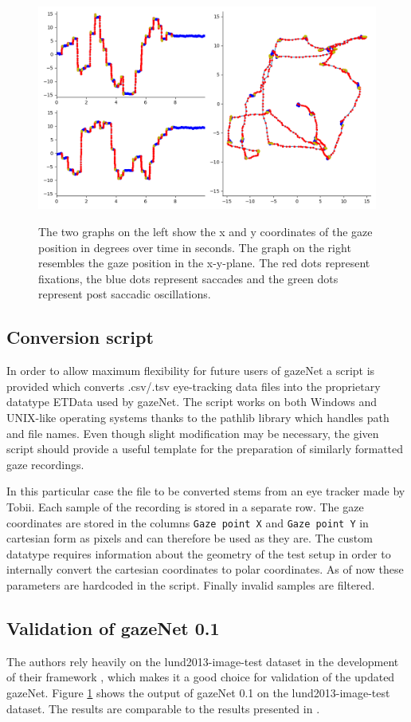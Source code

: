 \documentclass[conference]{IEEEtran}
\begin{document}
\begin{figure}
    \centering
    \includegraphics[width=0.6\linewidth]
    {TH34_img_Europe_labelled_MN}
    \label{fig:lund2013}
    \caption{The two graphs on the left show the x and y coordinates of the gaze position in degrees over time in seconds. The graph on the right resembles the gaze position in the x-y-plane. The red dots represent fixations, the blue dots represent saccades and the green dots represent post saccadic oscillations.}
\end{figure}


\subsection{Conversion script}
In order to allow maximum flexibility for future users of gazeNet a script is provided which converts .csv/.tsv eye-tracking data files into the proprietary datatype ETData used by gazeNet. The script works on both Windows and UNIX-like operating systems thanks to the pathlib library which handles path and file names. Even though slight modification may be necessary, the given script should provide a useful template for the preparation of similarly formatted gaze recordings. %

In this particular case the file to be converted stems from an eye tracker made by Tobii. Each sample of the recording is stored in a separate row. The gaze coordinates are stored in the columns \verb|Gaze point X| and \verb|Gaze point Y| in cartesian form as pixels and can therefore be used as they are. The custom datatype requires information about the geometry of the test setup in order to internally convert the cartesian coordinates to polar coordinates. As of now these parameters are hardcoded in the script. Finally invalid samples are filtered.


\subsection{Validation of gazeNet 0.1}
The authors rely heavily on the lund2013-image-test dataset in the development of their framework \cite{zemblys2018gazeNet}, which makes it a good choice for validation of the updated gazeNet. Figure \ref{fig:lund2013} shows the output of gazeNet 0.1 on the lund2013-image-test dataset. The results are comparable to the results presented in \cite{zemblys2018gazeNet}. 
\end{document}
